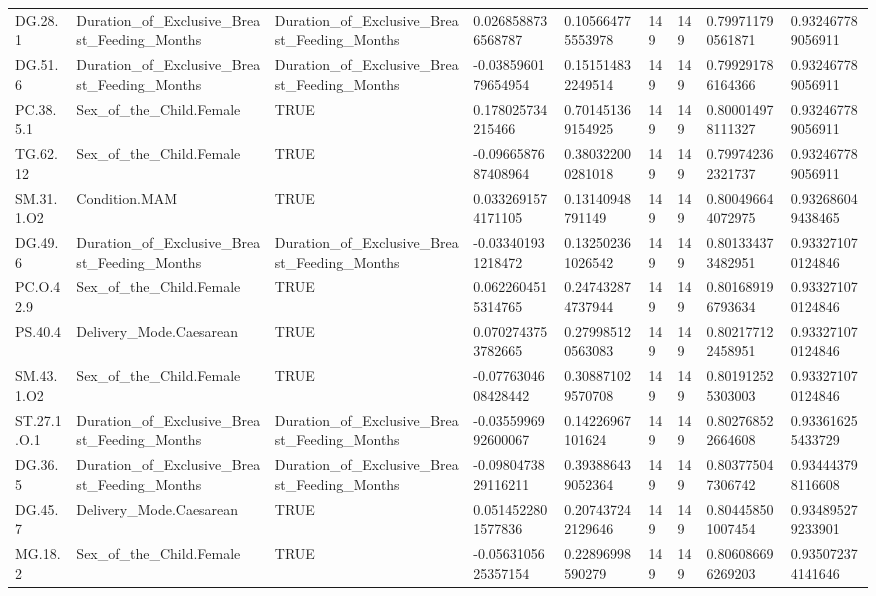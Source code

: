 \begin{longtable}{lllllllll}
DG.28.1 & Duration\_of\_Exclusive\_Breast\_Feeding\_Months & Duration\_of\_Exclusive\_Breast\_Feeding\_Months & 0.0268588736568787 & 0.105664775553978 & 149 & 149 & 0.799711790561871 & 0.932467789056911 \\
DG.51.6 & Duration\_of\_Exclusive\_Breast\_Feeding\_Months & Duration\_of\_Exclusive\_Breast\_Feeding\_Months & -0.0385960179654954 & 0.151514832249514 & 149 & 149 & 0.799291786164366 & 0.932467789056911 \\
PC.38.5.1 & Sex\_of\_the\_Child.Female & TRUE & 0.178025734215466 & 0.701451369154925 & 149 & 149 & 0.800014978111327 & 0.932467789056911 \\
TG.62.12 & Sex\_of\_the\_Child.Female & TRUE & -0.0966587687408964 & 0.380322000281018 & 149 & 149 & 0.799742362321737 & 0.932467789056911 \\
SM.31.1.O2 & Condition.MAM & TRUE & 0.0332691574171105 & 0.13140948791149 & 149 & 149 & 0.800496644072975 & 0.932686049438465 \\
DG.49.6 & Duration\_of\_Exclusive\_Breast\_Feeding\_Months & Duration\_of\_Exclusive\_Breast\_Feeding\_Months & -0.033401931218472 & 0.132502361026542 & 149 & 149 & 0.801334373482951 & 0.933271070124846 \\
PC.O.42.9 & Sex\_of\_the\_Child.Female & TRUE & 0.0622604515314765 & 0.247432874737944 & 149 & 149 & 0.801689196793634 & 0.933271070124846 \\
PS.40.4 & Delivery\_Mode.Caesarean & TRUE & 0.0702743753782665 & 0.279985120563083 & 149 & 149 & 0.802177122458951 & 0.933271070124846 \\
SM.43.1.O2 & Sex\_of\_the\_Child.Female & TRUE & -0.0776304608428442 & 0.308871029570708 & 149 & 149 & 0.801912525303003 & 0.933271070124846 \\
ST.27.1.O.1 & Duration\_of\_Exclusive\_Breast\_Feeding\_Months & Duration\_of\_Exclusive\_Breast\_Feeding\_Months & -0.0355996992600067 & 0.14226967101624 & 149 & 149 & 0.802768522664608 & 0.933616255433729 \\
DG.36.5 & Duration\_of\_Exclusive\_Breast\_Feeding\_Months & Duration\_of\_Exclusive\_Breast\_Feeding\_Months & -0.0980473829116211 & 0.393886439052364 & 149 & 149 & 0.803775047306742 & 0.934443798116608 \\
DG.45.7 & Delivery\_Mode.Caesarean & TRUE & 0.0514522801577836 & 0.207437242129646 & 149 & 149 & 0.804458501007454 & 0.934895279233901 \\
MG.18.2 & Sex\_of\_the\_Child.Female & TRUE & -0.0563105625357154 & 0.22896998590279 & 149 & 149 & 0.806086696269203 & 0.935072374141646 \\

\end{longtable}
